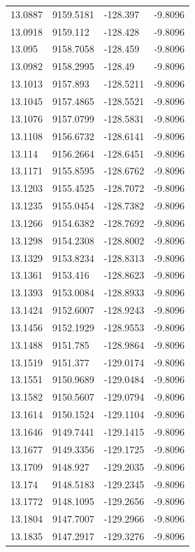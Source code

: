 \begin{table}[H]
\begin{tabular}{llll}
13.0887 & 9159.5181 & -128.397 & -9.8096 \\
13.0918 & 9159.112 & -128.428 & -9.8096 \\
13.095 & 9158.7058 & -128.459 & -9.8096 \\
13.0982 & 9158.2995 & -128.49 & -9.8096 \\
13.1013 & 9157.893 & -128.5211 & -9.8096 \\
13.1045 & 9157.4865 & -128.5521 & -9.8096 \\
13.1076 & 9157.0799 & -128.5831 & -9.8096 \\
13.1108 & 9156.6732 & -128.6141 & -9.8096 \\
13.114 & 9156.2664 & -128.6451 & -9.8096 \\
13.1171 & 9155.8595 & -128.6762 & -9.8096 \\
13.1203 & 9155.4525 & -128.7072 & -9.8096 \\
13.1235 & 9155.0454 & -128.7382 & -9.8096 \\
13.1266 & 9154.6382 & -128.7692 & -9.8096 \\
13.1298 & 9154.2308 & -128.8002 & -9.8096 \\
13.1329 & 9153.8234 & -128.8313 & -9.8096 \\
13.1361 & 9153.416 & -128.8623 & -9.8096 \\
13.1393 & 9153.0084 & -128.8933 & -9.8096 \\
13.1424 & 9152.6007 & -128.9243 & -9.8096 \\
13.1456 & 9152.1929 & -128.9553 & -9.8096 \\
13.1488 & 9151.785 & -128.9864 & -9.8096 \\
13.1519 & 9151.377 & -129.0174 & -9.8096 \\
13.1551 & 9150.9689 & -129.0484 & -9.8096 \\
13.1582 & 9150.5607 & -129.0794 & -9.8096 \\
13.1614 & 9150.1524 & -129.1104 & -9.8096 \\
13.1646 & 9149.7441 & -129.1415 & -9.8096 \\
13.1677 & 9149.3356 & -129.1725 & -9.8096 \\
13.1709 & 9148.927 & -129.2035 & -9.8096 \\
13.174 & 9148.5183 & -129.2345 & -9.8096 \\
13.1772 & 9148.1095 & -129.2656 & -9.8096 \\
13.1804 & 9147.7007 & -129.2966 & -9.8096 \\
13.1835 & 9147.2917 & -129.3276 & -9.8096 \\

\end{tabular}
\end{table}
